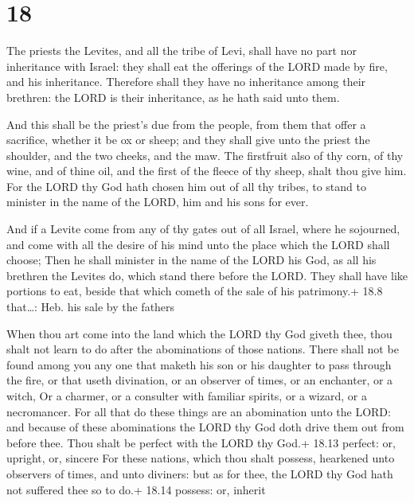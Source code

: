 \hypertarget{section-17}{%
\section{18}\label{section-17}}

 The priests the Levites, and all the tribe of Levi, shall
have no part nor inheritance with Israel: they shall eat the offerings
of the LORD made by fire, and his inheritance.  Therefore
shall they have no inheritance among their brethren: the LORD is their
inheritance, as he hath said unto them.

 And this shall be the priest's due from the people, from
them that offer a sacrifice, whether it be ox or sheep; and they shall
give unto the priest the shoulder, and the two cheeks, and the maw.
 The firstfruit also of thy corn, of thy wine, and of thine
oil, and the first of the fleece of thy sheep, shalt thou give him.
 For the LORD thy God hath chosen him out of all thy tribes,
to stand to minister in the name of the LORD, him and his sons for ever.

 And if a Levite come from any of thy gates out of all
Israel, where he sojourned, and come with all the desire of his mind
unto the place which the LORD shall choose;  Then he shall
minister in the name of the LORD his God, as all his brethren the
Levites do, which stand there before the LORD.  They shall
have like portions to eat, beside that which cometh of the sale of his
patrimony.+ 18.8 that\ldots: Heb. his sale by the fathers

 When thou art come into the land which the LORD thy God
giveth thee, thou shalt not learn to do after the abominations of those
nations.  There shall not be found among you any one that
maketh his son or his daughter to pass through the fire, or that useth
divination, or an observer of times, or an enchanter, or a witch,
 Or a charmer, or a consulter with familiar spirits, or a
wizard, or a necromancer.  For all that do these things are
an abomination unto the LORD: and because of these abominations the LORD
thy God doth drive them out from before thee.  Thou shalt
be perfect with the LORD thy God.+ 18.13 perfect: or, upright, or,
sincere  For these nations, which thou shalt possess,
hearkened unto observers of times, and unto diviners: but as for thee,
the LORD thy God hath not suffered thee so to do.+ 18.14 possess: or,
inherit

